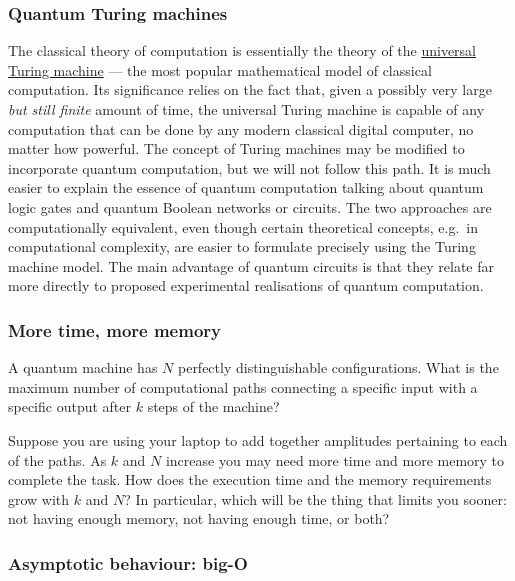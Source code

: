 \documentclass[fleqn,a4paper]{article}
\theoremstyle{definition}
\theoremstyle{definition}
\theoremstyle{definition}
\theoremstyle{definition}
\theoremstyle{remark}
\begin{document}
\hypertarget{quantum-turing-machines}{%
\subsubsection{Quantum Turing machines}\label{quantum-turing-machines}}

The classical theory of computation is essentially the theory of the \href{https://en.wikipedia.org/wiki/Universal_Turing_machine}{universal Turing machine} --- the most popular mathematical model of classical computation.
Its significance relies on the fact that, given a possibly very large \emph{but still finite} amount of time, the universal Turing machine is capable of any computation that can be done by any modern classical digital computer, no matter how powerful.
The concept of Turing machines may be modified to incorporate quantum computation, but we will not follow this path.
It is much easier to explain the essence of quantum computation talking about quantum logic gates and quantum Boolean networks or circuits.
The two approaches are computationally equivalent, even though certain theoretical concepts, e.g.~in computational complexity, are easier to formulate precisely using the Turing machine model.
The main advantage of quantum circuits is that they relate far more directly to proposed experimental realisations of quantum computation.

\hypertarget{more-time-more-memory}{%
\subsubsection{More time, more memory}\label{more-time-more-memory}}

A quantum machine has \(N\) perfectly distinguishable configurations.
What is the maximum number of computational paths connecting a specific input with a specific output after \(k\) steps of the machine?

Suppose you are using your laptop to add together amplitudes pertaining to each of the paths.
As \(k\) and \(N\) increase you may need more time and more memory to complete the task.
How does the execution time and the memory requirements grow with \(k\) and \(N\)?
In particular, which will be the thing that limits you sooner: not having enough memory, not having enough time, or both?

\hypertarget{big-o}{%
\subsubsection{Asymptotic behaviour: big-O}\label{big-o}}
\end{document}
